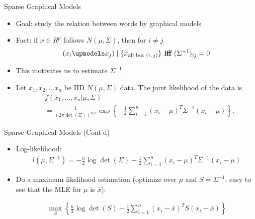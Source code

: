 \documentclass[12pt, trans]{beamer}
\newcommand{\1}[1]{{\mathbf 1}\left\{#1\right\}}        %
\def\lp{\left(}
\def\rp{\right)}
\begin{document}
\begin{frame}[fragile]{Sparse Graphical Models}

\begin{itemize}[<+->]
\item Goal: study the relation between words by graphical models
\item Fact: if $x\in R^p$ follows $N(\mu,\Sigma)$, then for $i\ne j$
\begin{align*}
(x_i  \upmodels %
x_j )\mid \{x_{\text{all but $(i,j)$}}\} \textbf{ iff } (\Sigma^{-1})_{ij}=0
\end{align*}
\item This motivates us to estimate $\Sigma^{-1}$.
\item Let $x_1,x_2,...x_n$ be IID $N(\mu,\Sigma)$ data. The joint likelihood of the data is
\begin{align*}
& f(x_1, \dots, x_n|\mu,\Sigma) 
\\&= \frac{1}{(2\pi \det\lp \Sigma\rp)^{n/2}}\exp\left\{ -\frac{1}{2} \sum_{i=1}^n(x_i-\mu)^T\Sigma^{-1}(x_i-\mu) \right\}.
\end{align*}

\end{itemize}

\end{frame}


\begin{frame}[fragile]{Sparse Graphical Models (Cont'd)}

\begin{itemize}[<+->]
\item  Log-likelihood:
\begin{align*}
l(\mu,\Sigma^{-1}) = -\frac{n}{2}\log \det \lp \Sigma \rp  -\frac{1}{2} \sum_{i=1}^n(x_i-\mu)^T\Sigma^{-1}(x_i-\mu)
\end{align*}

\item Do a maximum likelihood estimation (optimize over $\mu$ and $S = \Sigma^{-1}$; easy to see that the MLE for $\mu$ is $\bar{x}$):

\begin{align*}
\max_S\left\{  \frac{n}{2}\log \det\lp S \rp  -\frac{1}{2} \sum_{i=1}^n(x_i-\bar{x})^T S (x_i-\bar{x})\right\} 
\end{align*}


\end{itemize}

\end{frame}
\end{document}
